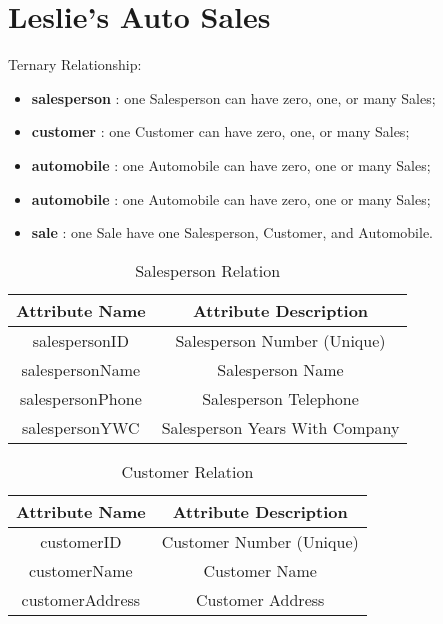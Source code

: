 \chapter{Leslie's Auto Sales}

Ternary Relationship:
\begin{itemize}
	\item{\textbf{salesperson} : one Salesperson can have zero, one, or many Sales;}
	\item{\textbf{customer} : one Customer can have zero, one, or many Sales;}
	\item{\textbf{automobile} : one Automobile can have zero, one or many Sales;}
	\item{\textbf{automobile} : one Automobile can have zero, one or many Sales;}
	\item{\textbf{sale} : one Sale have one Salesperson, Customer, and Automobile.}
\end{itemize}

\begin{table}[H]
	\begin{center}
		\begin{tabular}{|c|c|}
			\hline
			\textbf{Attribute Name} & \textbf{Attribute Description} \\ \hline
			salespersonID & Salesperson Number (Unique) \\ \hline
			salespersonName & Salesperson Name \\ \hline
			salespersonPhone & Salesperson Telephone \\ \hline
			salespersonYWC & Salesperson Years With Company \\ \hline
		\end{tabular}
		\caption{Salesperson Relation}
	\end{center}
\end{table}

\begin{table}[H]
	\begin{center}
		\begin{tabular}{|c|c|}
			\hline
			\textbf{Attribute Name} & \textbf{Attribute Description} \\ \hline
			customerID & Customer Number (Unique) \\ \hline
			customerName & Customer Name \\ \hline
			customerAddress & Customer Address \\ \hline
		\end{tabular}
		\caption{Customer Relation}
	\end{center}
\end{table}

